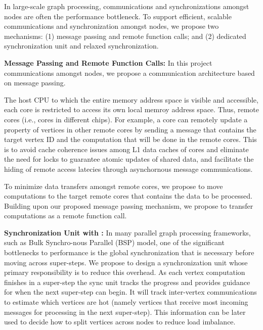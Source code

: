 

\noindent
In large-scale graph processing, communications and synchronizations amongst nodes are often the performance bottleneck.
To support efficient, scalable communications and synchronization amongst nodes, we propose two mechanisms:
(1) message passing and remote function calls; and (2) dedicated synchronization unit and relaxed synchronization.

\noindent
\textbf{Message Passing and Remote Function Calls:}
In this project communications amongst nodes, we propose a communication architecture based on message passing.

The host CPU to which the entire memory address space is visible and accessible, 
each core is restricted to access its own local memroy address space.
Thus, 
remote cores (i.e., cores in different chips).
For example, a core can remotely update a property of vertices in other remote cores by sending a message that contains the target vertex ID and the computation that will be done in the remote cores.
This is to avoid cache coherence issues among L1 data caches of cores and eliminate the need for locks to guarantee atomic updates of shared data, and facilitate the hiding of remote access latecies through asynchornous message communications.

To minimize data transfers amongst remote cores, we propose to move computations to the target remote cores that contains the data to be processed.
Building upon our proposed message passing mechanism, we propose to transfer computations as a remote function call.

\noindent
\textbf{Synchronization Unit with :} 
In many parallel graph processing frameworks, such as Bulk Synchro-nous Parallel (BSP) model, 
one of the significant bottlenecks to performance is the global synchronization that is necessary before moving across super-steps. 
We propose to design a synchronization unit whose primary responsibility is to reduce this overhead. 
As each vertex computation finishes in a super-step the sync unit tracks the progress and provides guidance for when the next super-step can begin. 
It will track inter-vertex communications to estimate which vertices are hot (namely vertices that receive most incoming messages for processing in the next super-step). 
This information can be later used to decide how to split vertices across nodes to reduce load imbalance. 

